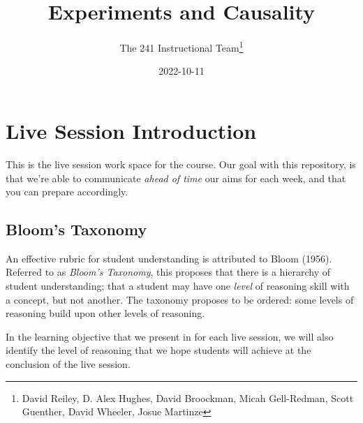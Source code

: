 \documentclass[
]{article}
\title{Experiments and Causality}
\author{The 241 Instructional Team\footnote{David Reiley, D. Alex Hughes, David Broockman, Micah Gell-Redman, Scott Guenther, David Wheeler, Josue Martinze}}
\date{2022-10-11}
\begin{document}
\maketitle

{
\setcounter{tocdepth}{2}
\tableofcontents
}
\hypertarget{live-session-introduction}{%
\section*{Live Session Introduction}\label{live-session-introduction}}

This is the live session work space for the course. Our goal with this repository, is that we're able to communicate \emph{ahead of time} our aims for each week, and that you can prepare accordingly.

\hypertarget{blooms-taxonomy}{%
\subsection*{Bloom's Taxonomy}\label{blooms-taxonomy}}

An effective rubric for student understanding is attributed to Bloom (1956). Referred to as \emph{Bloom's Taxonomy}, this proposes that there is a hierarchy of student understanding; that a student may have one \emph{level} of reasoning skill with a concept, but not another. The taxonomy proposes to be ordered: some levels of reasoning build upon other levels of reasoning.

In the learning objective that we present in for each live session, we will also identify the level of reasoning that we hope students will achieve at the conclusion of the live session.
\end{document}
